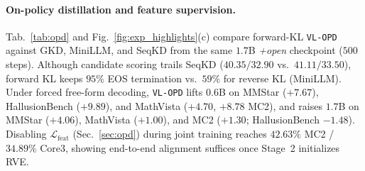 \paragraph{On-policy distillation and feature supervision.}
Tab.~\ref{tab:opd} and Fig.~\ref{fig:exp_highlights}(c) compare forward-KL
\texttt{VL-OPD} against GKD, MiniLLM, and SeqKD from the same $1.7$B
\emph{+open} checkpoint ($500$ steps). Although candidate scoring trails SeqKD
($40.35/32.90$ vs.\ $41.11/33.50$), forward KL keeps $95\%$ EOS termination
vs.\ $59\%$ for reverse KL (MiniLLM). Under forced free-form decoding,
\texttt{VL-OPD} lifts $0.6$B on MMStar ($+7.67$), HallusionBench ($+9.89$), and
MathVista ($+4.70$, $+8.78$ MC2), and raises $1.7$B on MMStar ($+4.06$),
MathVista ($+1.00$), and MC2 ($+1.30$; HallusionBench $-1.48$). Disabling
$\mathcal{L}_{\mathrm{feat}}$ (Sec.~\ref{sec:opd}) during joint training reaches
$42.63\%$ MC2 / $34.89\%$ Core3, showing end-to-end alignment suffices once
Stage~2 initializes RVE.

\begin{table}[t]
\centering
\caption{\textbf{Step~2 distillation objectives and free-generation gains}
($28$k \emph{+open}, $s{=}0$). Top: sequence/on-policy objectives from the same
$1.7$B \modelname-Free{} checkpoint ($500$ steps). Bottom: forced free-form
greedy generation without candidate scoring.}
\label{tab:opd}
\footnotesize
\setlength{\tabcolsep}{2.8pt}
\end{table}

